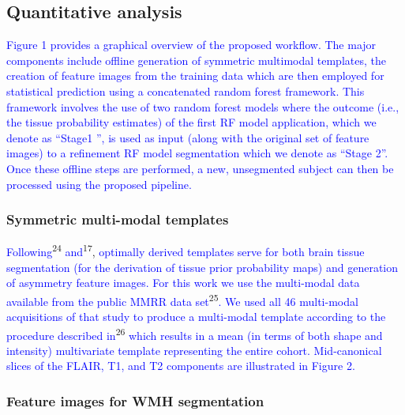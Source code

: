 \documentclass[11pt,]{article}
\begin{document}
\subsection{Quantitative analysis}\label{quantitative-analysis}

\textcolor{blue}{Figure 1 provides a graphical overview of the proposed workflow.  The major components
include offline generation of symmetric multimodal templates, the creation of
feature images from the training data which are then employed for statistical
prediction using a concatenated random forest framework.  This framework involves
the use of two random forest models where the outcome (i.e., the tissue
probability estimates) of the first RF model application,
which we denote as ``Stage1 '', is used as input (along with the original set of
feature images) to a refinement RF model segmentation which we denote as ``Stage 2''.
Once these offline steps
are performed, a new, unsegmented subject can then be processed using the proposed pipeline.}

\subsubsection{Symmetric multi-modal
templates}\label{symmetric-multi-modal-templates}

\textcolor{blue}{Following}\textsuperscript{24}
\textcolor{blue}{and}\textsuperscript{17},
\textcolor{blue}{optimally derived templates
serve for both brain tissue segmentation (for the derivation of tissue prior probability maps) and generation of asymmetry feature images.
For this work we use the multi-modal data available from the public MMRR data set}\textsuperscript{25}\textcolor{blue}{.  We used all 46 multi-modal acquisitions of that study to produce a multi-modal template according to the procedure described in}\textsuperscript{26}
\textcolor{blue}{which
results in a mean (in terms of both shape and intensity) multivariate template representing the entire cohort.  Mid-canonical slices of the FLAIR, T1, and T2 components are illustrated in Figure 2.}

\subsubsection{Feature images for WMH
segmentation}\label{feature-images-for-wmh-segmentation}
\end{document}

